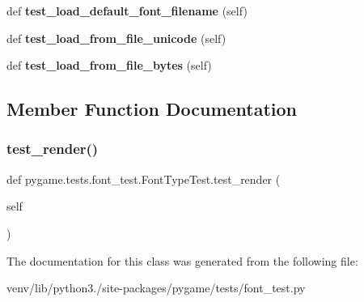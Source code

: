 \begin{DoxyCompactItemize}
\item 
\mbox{\label{classpygame_1_1tests_1_1font__test_1_1_font_type_test_a393d596db2f867698538ad513dd7f94d}} 
def {\bfseries test\+\_\+load\+\_\+default\+\_\+font\+\_\+filename} (self)
\item 
\mbox{\label{classpygame_1_1tests_1_1font__test_1_1_font_type_test_ab1ebb1adc6812ea3a88b208883f3143a}} 
def {\bfseries test\+\_\+load\+\_\+from\+\_\+file\+\_\+unicode} (self)
\item 
\mbox{\label{classpygame_1_1tests_1_1font__test_1_1_font_type_test_a42d3678ff871384cf2b853e018397dba}} 
def {\bfseries test\+\_\+load\+\_\+from\+\_\+file\+\_\+bytes} (self)
\end{DoxyCompactItemize}


\subsection{Member Function Documentation}
\mbox{\label{classpygame_1_1tests_1_1font__test_1_1_font_type_test_a13bea88369a4156679977ee2887cf40b}} 
\subsubsection{\texorpdfstring{test\+\_\+render()}{test\_render()}}
{\footnotesize\ttfamily def pygame.\+tests.\+font\+\_\+test.\+Font\+Type\+Test.\+test\+\_\+render (\begin{DoxyParamCaption}\item[{}]{self }\end{DoxyParamCaption})}

\begin{DoxyVerb}\end{DoxyVerb}
 

The documentation for this class was generated from the following file\+:\begin{DoxyCompactItemize}
\item 
venv/lib/python3./site-\/packages/pygame/tests/font\+\_\+test.\+py\end{DoxyCompactItemize}
